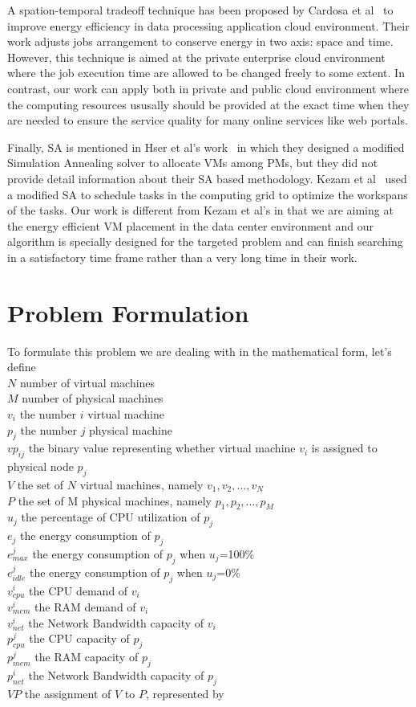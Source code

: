 \documentclass[10pt, conference, compsocconf]{IEEEtran}
\begin{document}
A spation-temporal tradeoff technique has been proposed by Cardosa et
al~\cite{cardosa11} to improve energy efficiency in data processing application
cloud environment.
Their work adjusts jobs arrangement to conserve energy in two axis: space and
time. However, this technique is aimed at the private enterprise cloud
environment where the job execution time are allowed to be changed freely to
some extent.
In contrast, our work can apply both in private and public cloud environment
where the computing resources ususally should be provided at the exact time when
they are needed to ensure the service quality for many online services like web
portals.

Finally, SA is mentioned in Hser et al's work~\cite{hyser07} in which they designed a modified
Simulation Annealing solver to allocate VMs among PMs, but they did not provide
detail information about their SA based methodology. Kezam et al~\cite{kazem08}
used a modified SA to schedule tasks in the computing grid to optimize the
workspans of the tasks. Our work is different from Kezam et al's in that we are
aiming at the energy efficient VM placement in the data center environment and
our algorithm is specially designed for the targeted problem and can finish searching in a
 satisfactory time frame rather than a very long time in their work.

\section{Problem Formulation}
To formulate this problem we are dealing with in the mathematical form, let's
define\\
$N$ number of virtual machines\\
$M$	number of physical machines\\
$v_i$	the number $i$ virtual machine\\
$p_j$	the number $j$ physical machine\\
$vp_{ij}$	the binary value representing whether virtual machine $v_i$ is
assigned to physical node $p_j$\\
$V$	the set of $N$ virtual machines, namely ${v_1,v_2,...,v_N}$\\
$P$	the set of M physical machines, namely ${p_1,p_2,...,p_M}$\\
$u_j$	the percentage of CPU utilization of $p_j$\\
$e_j$	the energy consumption of $p_j$\\
$e_{max}^j$	the energy consumption of $p_j$ when $u_j$=100\%\\
$e_{idle}^j$	the energy consumption of $p_j$ when $u_j$=0\%\\
$v_{cpu}^i$	the CPU demand of $v_i$\\
$v_{mem}^i$ the RAM demand of $v_i$\\
$v_{net}^i$	the Network Bandwidth capacity of $v_i$\\
$p_{cpu}^j$	 the CPU capacity of  $p_j$\\
$p_{mem}^j$ the RAM capacity of  $p_j$\\
$p_{net}^i$	the Network Bandwidth capacity of $p_j$\\
$VP$	the assignment of $V$ to $P$, represented by
\end{document}
